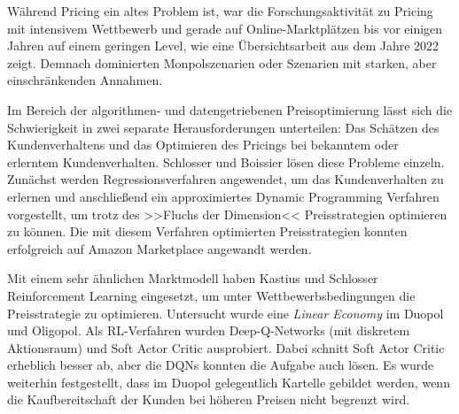 Während Pricing ein altes Problem ist, war die Forschungsaktivität zu Pricing mit intensivem Wettbewerb und gerade auf Online-Marktplätzen bis vor einigen Jahren auf einem geringen Level, wie eine Übersichtsarbeit aus dem Jahre 2022 zeigt. \cite{Gerpott2022}
Demnach dominierten Monpolszenarien oder Szenarien mit starken, aber einschränkenden Annahmen.

Im Bereich der algorithmen- und datengetriebenen Preisoptimierung lässt sich die Schwierigkeit in zwei separate Herausforderungen unterteilen: Das Schätzen des Kundenverhaltens und das Optimieren des Pricings bei bekanntem oder erlerntem Kundenverhalten.
Schlosser und Boissier \cite{10.1145/3219819.3219833} lösen diese Probleme einzeln.
Zunächst werden Regressionsverfahren angewendet, um das Kundenverhalten zu erlernen und anschließend ein approximiertes Dynamic Programming Verfahren vorgestellt, um trotz des >>Fluchs der Dimension<< Preisstrategien optimieren zu können.
Die mit diesem Verfahren optimierten Preisstrategien konnten erfolgreich auf Amazon Marketplace angewandt werden.

Mit einem sehr ähnlichen Marktmodell haben Kastius und Schlosser \cite{Kastius2022} Reinforcement Learning eingesetzt, um unter Wettbewerbsbedingungen die Preisstrategie zu optimieren.
Untersucht wurde eine \textit{Linear Economy} im Duopol und Oligopol.
Als RL-Verfahren wurden Deep-Q-Networks (mit diskretem Aktionsraum) und Soft Actor Critic ausprobiert.
Dabei schnitt Soft Actor Critic erheblich besser ab, aber die DQNs konnten die Aufgabe auch lösen.
Es wurde weiterhin festgestellt, dass im Duopol gelegentlich Kartelle gebildet werden, wenn die Kaufbereitschaft der Kunden bei höheren Preisen nicht begrenzt wird.